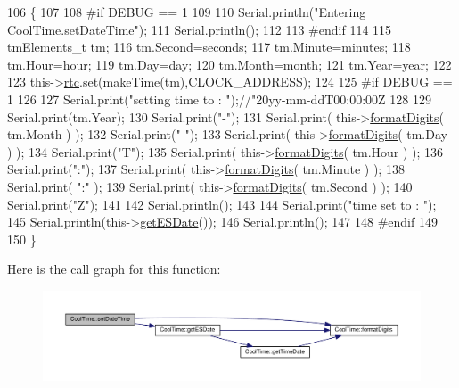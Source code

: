 \begin{DoxyCode}
106 \{ 
107 
108 \textcolor{preprocessor}{#if DEBUG == 1}
109 
110     Serial.println(\textcolor{stringliteral}{"Entering CoolTime.setDateTime"});
111     Serial.println();
112 
113 \textcolor{preprocessor}{#endif}
114 
115     tmElements\_t tm;
116     tm.Second=seconds; 
117     tm.Minute=minutes; 
118     tm.Hour=hour; 
119     tm.Day=day;
120     tm.Month=month; 
121     tm.Year=year;
122     
123     this->\hyperlink{classCoolTime_abd38f2384ff90692b1568d9db869412e}{rtc}.set(makeTime(tm),CLOCK\_ADDRESS);   
124 
125 \textcolor{preprocessor}{#if DEBUG == 1}
126 
127     Serial.print(\textcolor{stringliteral}{"setting time to : "});\textcolor{comment}{//"20yy-mm-ddT00:00:00Z}
128 
129     Serial.print(tm.Year);
130     Serial.print(\textcolor{stringliteral}{"-"});
131     Serial.print( this->\hyperlink{classCoolTime_acd537cd4210d7bde4e1f5c47d2ac0456}{formatDigits}( tm.Month ) );
132     Serial.print(\textcolor{stringliteral}{"-"});
133     Serial.print( this->\hyperlink{classCoolTime_acd537cd4210d7bde4e1f5c47d2ac0456}{formatDigits}( tm.Day ) );
134     Serial.print(\textcolor{stringliteral}{"T"});
135     Serial.print( this->\hyperlink{classCoolTime_acd537cd4210d7bde4e1f5c47d2ac0456}{formatDigits}( tm.Hour ) );
136     Serial.print(\textcolor{stringliteral}{":"});
137     Serial.print( this->\hyperlink{classCoolTime_acd537cd4210d7bde4e1f5c47d2ac0456}{formatDigits}( tm.Minute ) );
138     Serial.print( \textcolor{stringliteral}{":"} );
139     Serial.print( this->\hyperlink{classCoolTime_acd537cd4210d7bde4e1f5c47d2ac0456}{formatDigits}( tm.Second ) );
140     Serial.print(\textcolor{stringliteral}{"Z"});
141 
142     Serial.println();
143     
144     Serial.print(\textcolor{stringliteral}{"time set to : "});
145     Serial.println(this->\hyperlink{classCoolTime_ac4f32ee513c1328d984306645e8785a4}{getESDate}());
146     Serial.println();
147 
148 \textcolor{preprocessor}{#endif}
149 
150 \}
\end{DoxyCode}
Here is the call graph for this function\+:
\nopagebreak
\begin{figure}[H]
\begin{center}
\leavevmode
\includegraphics[width=350pt]{classCoolTime_ab81ea7fdaace111aa01cc1ec84c6d297_cgraph}
\end{center}
\end{figure}
\mbox{\label{classCoolTime_aae601f795452cfa48d9fb337aed483a8}} 
